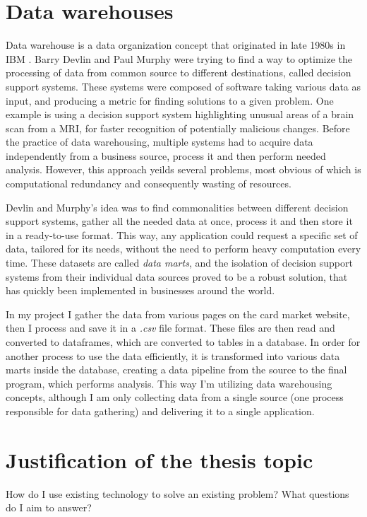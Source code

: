 \section{Data warehouses}
Data warehouse is a data organization concept that originated in late 1980s in IBM \cite{dataWarehouses}. Barry Devlin and Paul Murphy were trying to find a way to optimize the processing of data from common source to different destinations, called decision support systems. These systems were composed of software taking various data as input, and producing a metric for finding solutions to a given problem. One example is using a decision support system highlighting unusual areas of a brain scan from a MRI, for faster recognition of potentially malicious changes. Before the practice of data warehousing, multiple systems had to acquire data independently from a business source, process it and then perform needed analysis. However, this approach yeilds several problems, most obvious of which is computational redundancy and consequently wasting of resources. \par
Devlin and Murphy's idea was to find commonalities between different decision support systems, gather all the needed data at once, process it and then store it in a ready-to-use format. This way, any application could request a specific set of data, tailored for its needs, without the need to perform heavy computation every time. These datasets are called \textit{data marts}, and the isolation of decision support systems from their individual data sources proved to be a robust solution, that has quickly been implemented in businesses around the world. \par
In my project I gather the data from various pages on the card market website, then I process and save it in a \textit{.csv} file format. These files are then read and converted to dataframes, which are converted to tables in a database. In order for another process to use the data efficiently, it is transformed into various data marts inside the database, creating a data pipeline from the source to the final program, which performs analysis. This way I'm utilizing data warehousing concepts, although I am only collecting data from a single source (one process responsible for data gathering) and delivering it to a single application.


\section{Justification of the thesis topic}
How do I use existing technology to solve an existing problem?
What questions do I aim to answer?
